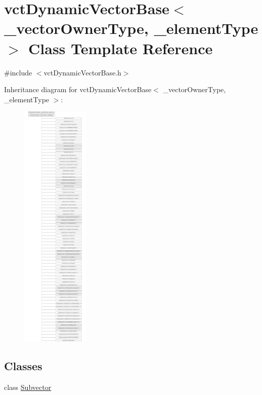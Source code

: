 \hypertarget{classvct_dynamic_vector_base}{\section{vct\-Dynamic\-Vector\-Base$<$ \-\_\-vector\-Owner\-Type, \-\_\-element\-Type $>$ Class Template Reference}
\label{classvct_dynamic_vector_base}
}


{\ttfamily \#include $<$vct\-Dynamic\-Vector\-Base.\-h$>$}

Inheritance diagram for vct\-Dynamic\-Vector\-Base$<$ \-\_\-vector\-Owner\-Type, \-\_\-element\-Type $>$\-:\begin{figure}[H]
\begin{center}
\leavevmode
\includegraphics[height=12.000000cm]{d5/dc5/classvct_dynamic_vector_base}
\end{center}
\end{figure}
\subsection*{Classes}
\begin{DoxyCompactItemize}
\item 
class \hyperlink{classvct_dynamic_vector_base_1_1_subvector}{Subvector}
\end{DoxyCompactItemize}

